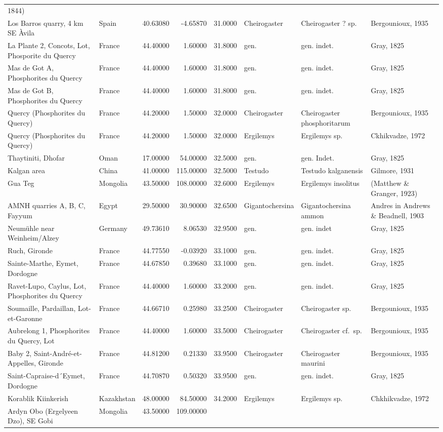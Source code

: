 \documentclass[]{article}
\begin{document}
\begin{longtable}[]{@{}llrrrlll@{}}
1844)\tabularnewline
Los Barros quarry, 4 km SE Àvila & Spain & 40.63080 & -4.65870 & 31.0000
& Cheirogaster & Cheirogaster ? sp. & Bergounioux, 1935\tabularnewline
La Plante 2, Concots, Lot, Phosporite du Quercy & France & 44.40000 &
1.60000 & 31.8000 & gen. & gen. indet. & Gray, 1825\tabularnewline
Mas de Got A, Phosphorites du Quercy & France & 44.40000 & 1.60000 &
31.8000 & gen. & gen. indet. & Gray, 1825\tabularnewline
Mas de Got B, Phosphorites du Quercy & France & 44.40000 & 1.60000 &
31.8000 & gen. & gen. indet. & Gray, 1825\tabularnewline
Quercy (Phosphorites du Quercy) & France & 44.20000 & 1.50000 & 32.0000
& Cheirogaster & Cheirogaster phosphoritarum & Bergounioux,
1935\tabularnewline
Quercy (Phosphorites du Quercy) & France & 44.20000 & 1.50000 & 32.0000
& Ergilemys & Ergilemys sp. & Ckhikvadze, 1972\tabularnewline
Thaytiniti, Dhofar & Oman & 17.00000 & 54.00000 & 32.5000 & gen. & gen.
Indet. & Gray, 1825\tabularnewline
Kalgan area & China & 41.00000 & 115.00000 & 32.5000 & Testudo & Testudo
kalganensis & Gilmore, 1931\tabularnewline
Gua Teg & Mongolia & 43.50000 & 108.00000 & 32.6000 & Ergilemys &
Ergilemys insolitus & (Matthew \& Granger, 1923)\tabularnewline
AMNH quarries A, B, C, Fayyum & Egypt & 29.50000 & 30.90000 & 32.6500 &
Gigantochersina & Gigantochersina ammon & Andres in Andrews \& Beadnell,
1903\tabularnewline
Neumühle near Weinheim/Alzey & Germany & 49.73610 & 8.06530 & 32.9500 &
gen. & gen. indet & Gray, 1825\tabularnewline
Ruch, Gironde & France & 44.77550 & -0.03920 & 33.1000 & gen. & gen.
indet. & Gray, 1825\tabularnewline
Sainte-Marthe, Eymet, Dordogne & France & 44.67850 & 0.39680 & 33.1000 &
gen. & gen. indet. & Gray, 1825\tabularnewline
Ravet-Lupo, Caylus, Lot, Phosphorites du Quercy & France & 44.40000 &
1.60000 & 33.2000 & gen. & gen. indet. & Gray, 1825\tabularnewline
Soumaille, Pardaillan, Lot-et-Garonne & France & 44.66710 & 0.25980 &
33.2500 & Cheirogaster & Cheirogaster sp. & Bergounioux,
1935\tabularnewline
Aubrelong 1, Phosphorites du Quercy, Lot & France & 44.40000 & 1.60000 &
33.5000 & Cheirogaster & Cheirogaster cf.~sp. & Bergounioux,
1935\tabularnewline
Baby 2, Saint-André-et-Appelles, Gironde & France & 44.81200 & 0.21330 &
33.9500 & Cheirogaster & Cheirogaster maurini & Bergounioux,
1935\tabularnewline
Saint-Capraise-d´Eymet, Dordogne & France & 44.70870 & 0.50320 & 33.9500
& gen. & gen. indet. & Gray, 1825\tabularnewline
Korablik Kiinkerish & Kazakhstan & 48.00000 & 84.50000 & 34.2000 &
Ergilemys & Ergilemys sp. & Chkhikvadze, 1972\tabularnewline
Ardyn Obo (Ergelyeen Dzo), SE Gobi & Mongolia & 43.50000 & 109.00000 &

\end{longtable}
\end{document}
